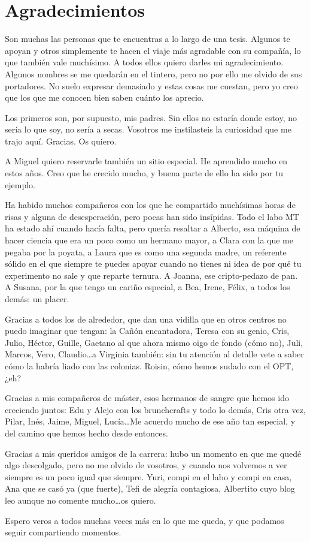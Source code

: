 \chapter*{Agradecimientos}

Son muchas las personas que te encuentras a lo largo de una tesis. Algunos te apoyan y otros simplemente te hacen el viaje más agradable con su compañía, lo que también vale muchísimo. A todos ellos quiero darles mi agradecimiento. Algunos nombres se me quedarán en el tintero, pero no por ello me olvido de sus portadores. No suelo expresar demasiado y estas cosas me cuestan, pero yo creo que los que me conocen bien saben cuánto los aprecio. 

Los primeros son, por supuesto, mis padres. Sin ellos no estaría donde estoy, no sería lo que soy, no sería a secas. Vosotros me instilasteis la curiosidad que me trajo aquí. Gracias. Os quiero.

A Miguel quiero reservarle también un sitio especial. He aprendido mucho en estos años. Creo que he crecido mucho, y buena parte de ello ha sido por tu ejemplo. 

Ha habido muchos compañeros con los que he compartido muchísimas horas de risas y alguna de desesperación, pero pocas han sido insípidas. Todo el labo MT ha estado ahí cuando hacía falta, pero quería resaltar a Alberto, esa máquina de hacer ciencia que era un poco como un hermano mayor, a Clara con la que me pegaba por la poyata, a Laura que es como una segunda madre, un referente sólido en el que siempre te puedes apoyar cuando no tienes ni idea de por qué tu experimento no sale y que reparte ternura. A Joanna, ese cripto-pedazo de pan. A Susana, por la que tengo un cariño especial, a Bea, Irene, Félix, a todos los demás: un placer.

Gracias a todos los de alrededor, que dan una vidilla que en otros centros no puedo imaginar que tengan: la Cañón encantadora, Teresa con su genio, Cris, Julio, Héctor, Guille, Gaetano al que ahora mismo oigo de fondo (cómo no), Juli, Marcos, Vero, Claudio\ldots a Virginia también: sin tu atención al detalle vete a saber cómo la habría liado con las colonias. Roisin, cómo hemos sudado con el OPT, ¿eh?

Gracias a mis compañeros de máster, esos hermanos de sangre que hemos ido creciendo juntos: Edu y Alejo con los brunchcrafts y todo lo demás, Cris otra vez, Pilar, Inés, Jaime, Miguel, Lucía\ldots Me acuerdo mucho de ese año tan especial, y del camino que hemos hecho desde entonces.

Gracias a mis queridos amigos de la carrera: hubo un momento en que me quedé algo descolgado, pero no me olvido de vosotros, y cuando nos volvemos a ver siempre es un poco igual que siempre. Yuri, compi en el labo y compi en casa, Ana que se casó ya (que fuerte), Tefi de alegría contagiosa, Albertito cuyo blog leo aunque no comente mucho\ldots os quiero. 

Espero veros a todos muchas veces más en lo que me queda, y que podamos seguir compartiendo momentos.

\thispagestyle{cleared}